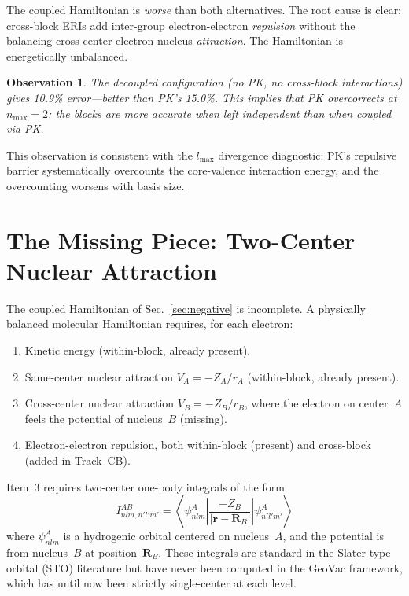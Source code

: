 \documentclass[aps,pra,twocolumn,superscriptaddress,longbibliography]{revtex4-2}
\newtheorem{observation}{Observation}
\begin{document}
The coupled Hamiltonian is \emph{worse} than both alternatives.  The
root cause is clear: cross-block ERIs add inter-group electron-electron
\emph{repulsion} without the balancing cross-center electron-nucleus
\emph{attraction}.  The Hamiltonian is energetically unbalanced.

\begin{observation}
\label{obs:decoupled}
The decoupled configuration (no PK, no cross-block interactions)
gives 10.9\% error---better than PK's 15.0\%.  This implies that
PK overcorrects at $n_{\max} = 2$: the blocks are more accurate
when left independent than when coupled via PK.
\end{observation}

This observation is consistent with the $l_{\max}$ divergence
diagnostic: PK's repulsive barrier systematically overcounts the
core-valence interaction energy, and the overcounting worsens with
basis size.


\section{The Missing Piece: Two-Center Nuclear Attraction}
\label{sec:twocenter}

The coupled Hamiltonian of Sec.~\ref{sec:negative} is incomplete.
A physically balanced molecular Hamiltonian requires, for each
electron:
\begin{enumerate}
\item Kinetic energy (within-block, already present).
\item Same-center nuclear attraction $V_A = -Z_A / r_A$ (within-block, already present).
\item Cross-center nuclear attraction $V_B = -Z_B / r_B$, where the
  electron on center~$A$ feels the potential of nucleus~$B$ (missing).
\item Electron-electron repulsion, both within-block (present) and
  cross-block (added in Track~CB).
\end{enumerate}

Item~3 requires two-center one-body integrals of the form
\begin{equation}
\label{eq:vne_cross}
I_{nlm, n'l'm'}^{AB} = \left\langle \psi_{nlm}^A \left|
  \frac{-Z_B}{|\mathbf{r} - \mathbf{R}_B|} \right|
  \psi_{n'l'm'}^A \right\rangle
\end{equation}
where $\psi_{nlm}^A$ is a hydrogenic orbital centered on nucleus~$A$,
and the potential is from nucleus~$B$ at position~$\mathbf{R}_B$.
These integrals are standard in the Slater-type orbital (STO)
literature but have never been computed in the GeoVac framework,
which has until now been strictly single-center at each level.
\end{document}
